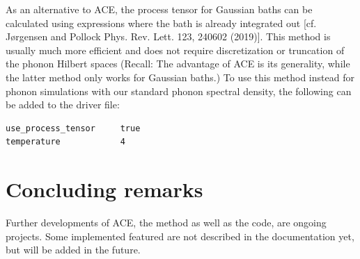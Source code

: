 \documentclass{scrartcl}
\begin{document}
As an alternative to ACE, the process tensor for Gaussian baths can be 
calculated using expressions where the bath is already integrated out
[cf. {J{\o}rgensen and Pollock} Phys. Rev. Lett. 123, 240602 (2019)]. 
This method is usually much more 
efficient and does not require discretization or truncation of the phonon
Hilbert spaces (Recall: The advantage of ACE is its generality, while 
the latter method only works for Gaussian baths.)
To use this method instead for phonon simulations with our standard 
phonon spectral density, the following can be added to the driver file:

\begin{verbatim}
use_process_tensor     true
temperature            4
\end{verbatim}

\section{Concluding remarks}
Further developments of ACE, the method as well as the code, 
are ongoing projects. Some implemented featured are not described in the 
documentation yet, but will be added in the future.
\end{document}
